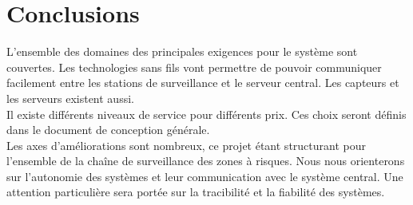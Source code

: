 \section{Conclusions}

L'ensemble des domaines des principales exigences pour le système sont
couvertes. Les technologies sans fils vont permettre de pouvoir communiquer
facilement entre les stations de surveillance et le serveur central. Les 
capteurs et les serveurs existent aussi.\\
Il existe différents niveaux de service pour différents prix. 
Ces choix seront définis dans le document de conception générale. \\ 

Les axes d'améliorations sont nombreux, ce projet étant structurant pour
l'ensemble de la chaîne de surveillance des zones à risques. Nous nous
orienterons sur l'autonomie des systèmes et leur communication avec le
système central. Une attention particulière sera portée sur la tracibilité
et la fiabilité des systèmes.

